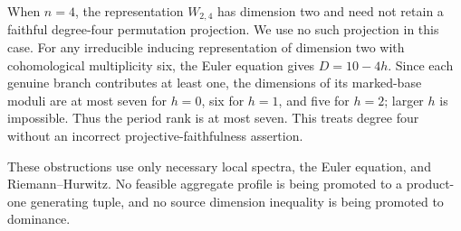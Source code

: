 When $n=4$, the representation $W_{2,4}$ has dimension two and
need not retain a faithful degree-four permutation projection.
We use no such projection in this case.
For any irreducible inducing representation of dimension two with
cohomological multiplicity six, the Euler equation gives
$D=10-4h$.  Since each genuine branch contributes at least one,
the dimensions of its marked-base moduli are at most seven for
$h=0$, six for $h=1$, and five for $h=2$; larger $h$ is impossible.
Thus the period rank is at most seven.  This treats degree four
without an incorrect projective-faithfulness assertion.

These obstructions use only necessary local spectra, the Euler
equation, and Riemann--Hurwitz.  No feasible aggregate profile is
being promoted to a product-one generating tuple, and no source
dimension inequality is being promoted to dominance.
